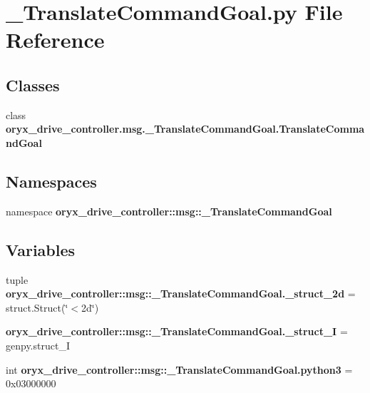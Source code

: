 \section{\-\_\-\-Translate\-Command\-Goal.\-py \-File \-Reference}
\label{__TranslateCommandGoal_8py}
\subsection*{\-Classes}
\begin{DoxyCompactItemize}
\item 
class {\bf oryx\-\_\-drive\-\_\-controller.\-msg.\-\_\-\-Translate\-Command\-Goal.\-Translate\-Command\-Goal}
\end{DoxyCompactItemize}
\subsection*{\-Namespaces}
\begin{DoxyCompactItemize}
\item 
namespace {\bf oryx\-\_\-drive\-\_\-controller\-::msg\-::\-\_\-\-Translate\-Command\-Goal}
\end{DoxyCompactItemize}
\subsection*{\-Variables}
\begin{DoxyCompactItemize}
\item 
tuple {\bf oryx\-\_\-drive\-\_\-controller\-::msg\-::\-\_\-\-Translate\-Command\-Goal.\-\_\-struct\-\_\-2d} = struct.\-Struct(\char`\"{}$<$2d\char`\"{})
\item 
{\bf oryx\-\_\-drive\-\_\-controller\-::msg\-::\-\_\-\-Translate\-Command\-Goal.\-\_\-struct\-\_\-\-I} = genpy.\-struct\-\_\-\-I
\item 
int {\bf oryx\-\_\-drive\-\_\-controller\-::msg\-::\-\_\-\-Translate\-Command\-Goal.\-python3} = 0x03000000
\end{DoxyCompactItemize}
